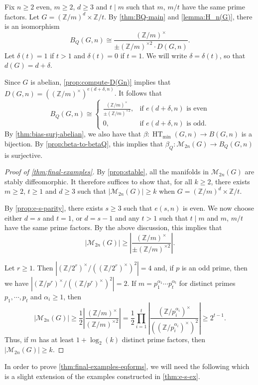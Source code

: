 \documentclass[11pt,a4paper,leqno]{amsart}
\theoremstyle{definition}
\theoremstyle{remark}
\newcommand{\Z}{\mathbb{Z}}
\DeclareMathOperator{\HT}{HT}
\newcommand{\sM}{\mathscr{M}}
\begin{document}
Fix $n \ge 2$ even, $m \ge 2$, $d \ge 3$ and $t \mid m$ such that $m$, $m/t$ have the same prime factors. Let $G = (\Z/m)^d \times \Z/t$. By \cref{thm:BQ-main} and \cref{lemma:H_n(G)}, there is an isomorphism
\[ B_Q(G,n) \cong \frac{(\Z/ m)^\times}{\pm (\Z/ m)^{\times 2} \cdot D(G,n)}.\]
Let $\delta(t) = 1$ if $t > 1$ and $\delta(t) = 0$ if $t=1$. We will write $\delta = \delta(t)$, so that $d(G) = d+\delta$.

Since $G$ is abelian, \cref{prop:compute-D(Gn)} implies that $D(G,n) = ((\Z/m)^\times)^{e(d+\delta,n)}$. It follows that
\[ B_Q(G,n) \cong \begin{cases} \frac{(\Z/ m)^\times}{\pm (\Z/ m)^{\times 2}} , & \text{if $e(d+\delta,n)$ is even} \\ 
 0, & \text{if $e(d+\delta,n)$ is odd}.	
 \end{cases}
 \]
By \cref{thm:bias-surj-abelian}, we also have that $\beta\colon\HT_{\min}(G,n) \to B(G,n)$ is a bijection. By \cref{prop:beta-to-betaQ}, this implies that
 $\beta_Q\colon  \sM_{2n}(G) \to B_Q(G,n)$ is surjective. 

\begin{proof}[Proof of \cref{thm:final-examples}]
By \cref{prop:stable}, all the manifolds in $\sM_{2n}(G)$ are stably diffeomorphic. 
It therefore suffices to show that, for all $k \ge 2$, there exists $m \ge 2$, $t \ge 1$ and $d \ge 3$ such that $|\sM_{2n}(G)| \ge k$ when $G = (\Z/m)^d \times \Z/t$. 

By \cref{prop:e-s-parity}, there exists $s \ge 3$ such that $e(s,n)$ is even. We now choose either $d=s$ and $t=1$, or $d=s-1$ and any $t >1$ such that $t \mid m$ and $m$, $m/t$ have the same prime factors.
By the above discussion, this implies that 
\[ |\sM_{2n}(G)| \ge \left| \frac{(\Z/ m)^\times}{\pm (\Z/ m)^{\times 2}} \right|. \]

Let $r \ge 1$. Then $|(\Z/2^r)^\times/((\Z/2^r)^\times)^2| = 4$ and, if $p$ is an odd prime, then we have $|(\Z/p^r)^\times/((\Z/p^r)^\times)^2| = 2$. If $m = p_1^{\alpha_1} \cdots p_t^{\alpha_t}$ for distinct primes $p_1, \cdots, p_t$ and $\alpha_i \ge 1$, then
\[ |\sM_{2n}(G)| \ge \frac{1}{2}\left| \frac{(\Z/ m)^\times}{(\Z/ m)^{\times 2}} \right| = \frac{1}{2} \prod_{i=1}^t\left| \frac{(\Z/ p_i^{\alpha_i})^\times}{((\Z/ p_i^{\alpha_i})^\times)^2} \right| \ge 2^{t-1}. \]
Thus, if $m$ has at least $1+\log_2(k)$ distinct prime factors, then $|\sM_{2n}(G)| \ge k$.
\end{proof}

In order to prove \cref{thm:final-examples-eqforms}, we will need the following which is a slight extension of the examples constructed in \cref{thm:e-s-ex}.
\end{document}

